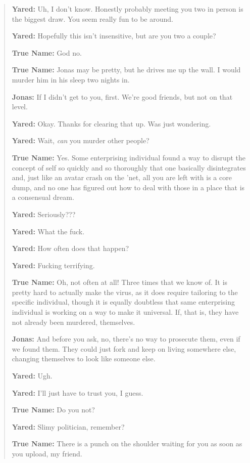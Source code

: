 \begin{quote}
\textbf{Yared:} Uh, I don't know. Honestly probably meeting you two in person is the biggest draw. You seem really fun to be around.

\textbf{Yared:} Hopefully this isn't insensitive, but are you two a couple?

\textbf{True Name:} God no.

\textbf{True Name:} Jonas may be pretty, but he drives me up the wall. I would murder him in his sleep two nights in.

\textbf{Jonas:} If I didn't get to you, first. We're good friends, but not on that level.

\textbf{Yared:} Okay. Thanks for clearing that up. Was just wondering.

\textbf{Yared:} Wait, \emph{can} you murder other people?

\textbf{True Name:} Yes. Some enterprising individual found a way to disrupt the concept of self so quickly and so thoroughly that one basically disintegrates and, just like an avatar crash on the 'net, all you are left with is a core dump, and no one has figured out how to deal with those in a place that is a consensual dream.

\textbf{Yared:} Seriously???

\textbf{Yared:} What the fuck.

\textbf{Yared:} How often does that happen?

\textbf{Yared:} Fucking terrifying.

\textbf{True Name:} Oh, not often at all! Three times that we know of. It is pretty hard to actually make the virus, as it does require tailoring to the specific individual, though it is equally doubtless that same enterprising individual is working on a way to make it universal. If, that is, they have not already been murdered, themselves.

\textbf{Jonas:} And before you ask, no, there's no way to prosecute them, even if we found them. They could just fork and keep on living somewhere else, changing themselves to look like someone else.

\textbf{Yared:} Ugh.

\textbf{Yared:} I'll just have to trust you, I guess.

\textbf{True Name:} Do you not?

\textbf{Yared:} Slimy politician, remember?

\textbf{True Name:} There is a punch on the shoulder waiting for you as soon as you upload, my friend.


\end{quote}
